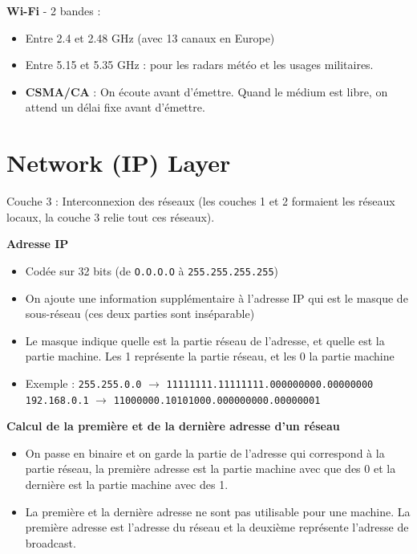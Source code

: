 \documentclass[a4paper,9pt, twocolumn]{article}
\begin{document}
	\textbf{Wi-Fi} - 2 bandes : 
	\begin{itemize}
		\item Entre 2.4 et 2.48 GHz (avec 13 canaux en Europe)
		\item Entre 5.15 et 5.35 GHz : pour les radars météo et les usages militaires.
		\item \textbf{CSMA/CA} : On écoute avant d'émettre.
			Quand le médium est libre, on attend un délai fixe avant d'émettre.
	\end{itemize}
	
	
\section*{Network (IP) Layer}

	Couche 3 : Interconnexion des réseaux (les couches 1 et 2 formaient les réseaux locaux, la couche 3 relie tout ces réseaux).
	
	\textbf{Adresse IP}
	\begin{itemize}
		\item Codée sur 32 bits (de \texttt{O.O.O.O} à \texttt{255.255.255.255})
		\item On ajoute une information supplémentaire à l'adresse IP qui est le masque de sous-réseau (ces deux parties sont inséparable)
		\item Le masque indique quelle est la partie réseau de l'adresse, et quelle est la partie machine. Les 1 représente la partie réseau, et les 0 la partie machine
		\item Exemple : 
		\texttt{255.255.0.0} $\longrightarrow$ \texttt{11111111.11111111.000000000.00000000}
		\texttt{192.168.0.1} $\longrightarrow$ \texttt{11000000.10101000.000000000.00000001}
	\end{itemize}

	\textbf{Calcul de la première et de la dernière adresse d'un réseau}
	\begin{itemize}
		\item On passe en binaire et on garde la partie de l'adresse qui correspond à la partie réseau, la première adresse est la partie machine avec que des 0 et la dernière est la partie machine avec des 1.
		\item La première et la dernière adresse ne sont pas utilisable pour une machine. La première adresse est l'adresse du réseau et la deuxième représente l'adresse de broadcast.
	\end{itemize}
	
\end{document}
